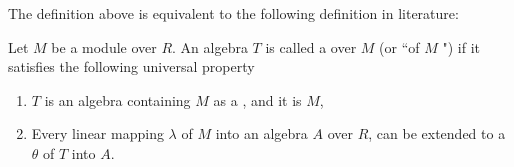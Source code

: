 \begin{remark}
    \label{mk:TensorAlgebra}

    The definition above is equivalent to the following definition in literature:

    Let $M$ be a module over $R$. An algebra $T$ is called a  over $M$ (or ``of $M$ ")
    if it satisfies the following universal property

    \begin{enumerate}
    \item $T$ is an algebra containing $M$ as a , and it is  $M$,
    \item Every linear mapping $\lambda$ of $M$ into an algebra $A$ over $R$, can be extended to 
    a  $\theta$ of $T$ into $A$.
    \end{enumerate}
    
\end{remark}